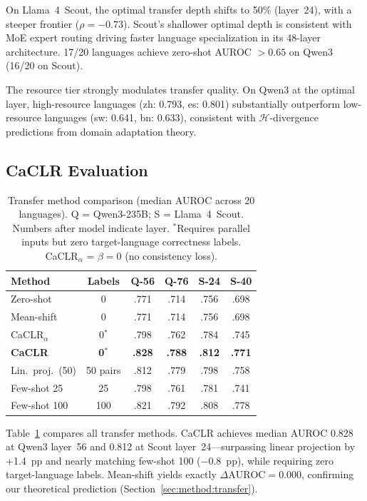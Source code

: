 \documentclass[11pt,a4paper]{article}
\begin{document}
On Llama~4~Scout, the optimal transfer depth shifts to 50\% (layer~24), with a steeper frontier ($\rho = -0.73$).
Scout's shallower optimal depth is consistent with MoE expert routing driving faster language specialization in its 48-layer architecture.
17/20 languages achieve zero-shot AUROC $> 0.65$ on Qwen3 (16/20 on Scout).

The resource tier strongly modulates transfer quality.
On Qwen3 at the optimal layer, high-resource languages (zh: 0.793, es: 0.801) substantially outperform low-resource languages (sw: 0.641, bn: 0.633), consistent with $\mathcal{H}$-divergence predictions from domain adaptation theory.

\subsection{CaCLR Evaluation}
\label{sec:exp:caclr}

\begin{table}[t]
\centering
\small
\begin{tabular}{@{}lccccc@{}}
\toprule
\textbf{Method} & \textbf{Labels} & \textbf{Q-56} & \textbf{Q-76} & \textbf{S-24} & \textbf{S-40} \\
\midrule
Zero-shot & 0 & .771 & .714 & .756 & .698 \\
Mean-shift & 0 & .771 & .714 & .756 & .698 \\
CaCLR$_{\alpha}$ & 0$^*$ & .798 & .762 & .784 & .745 \\
\textbf{CaCLR} & \textbf{0$^*$} & \textbf{.828} & \textbf{.788} & \textbf{.812} & \textbf{.771} \\
Lin.\ proj.\ (50) & 50 pairs & .812 & .779 & .798 & .758 \\
Few-shot 25 & 25 & .798 & .761 & .781 & .741 \\
Few-shot 100 & 100 & .821 & .792 & .808 & .778 \\
\bottomrule
\end{tabular}
\caption{Transfer method comparison (median AUROC across 20 languages). Q = Qwen3-235B; S = Llama~4~Scout. Numbers after model indicate layer. $^*$Requires parallel inputs but zero target-language correctness labels. CaCLR$_\alpha$ = $\beta=0$ (no consistency loss).}
\label{tab:transfer}
\end{table}

Table~\ref{tab:transfer} compares all transfer methods.
CaCLR achieves median AUROC 0.828 at Qwen3 layer~56 and 0.812 at Scout layer~24---surpassing linear projection by +1.4~pp and nearly matching few-shot 100 ($-0.8$~pp), while requiring zero target-language labels.
Mean-shift yields exactly $\Delta\text{AUROC} = 0.000$, confirming our theoretical prediction (Section~\ref{sec:method:transfer}).
\end{document}
